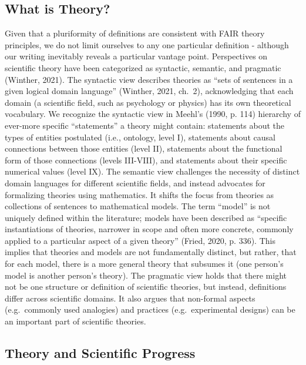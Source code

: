 \documentclass[
  man, noextraspace,floatsintext]{apa7}
\begin{document}
\subsection{What is Theory?}\label{what-is-theory}

Given that a pluriformity of definitions are consistent with FAIR theory principles,
we do not limit ourselves to any one particular definition - although our writing inevitably reveals a particular vantage point.
Perspectives on scientific theory have been categorized as syntactic, semantic, and pragmatic (Winther, 2021).
The syntactic view describes theories as ``sets of sentences in a given logical domain language'' (Winther, 2021, ch.~2),
acknowledging that each domain (a scientific field, such as psychology or physics) has its own theoretical vocabulary.
We recognize the syntactic view in Meehl's (1990, p. 114) hierarchy of ever-more specific ``statements'' a theory might contain:
statements about the types of entities postulated (i.e., ontology, level I),
statements about causal connections between those entities (level II),
statements about the functional form of those connections (levels III-VIII),
and statements about their specific numerical values (level IX).
The semantic view challenges the necessity of distinct domain languages for different scientific fields, and instead advocates for formalizing theories using mathematics.
It shifts the focus from theories as collections of sentences to mathematical models.
The term ``model'' is not uniquely defined within the literature;
models have been described as ``specific instantiations of theories, narrower in scope and often more concrete, commonly applied to a particular aspect of a given theory'' (Fried, 2020, p. 336).
This implies that theories and models are not fundamentally distinct, but rather, that for each model, there is a more general theory that subsumes it (one person's model is another person's theory).
The pragmatic view holds that there might not be one structure or definition of scientific theories, but instead, definitions differ across scientific domains.
It also argues that non-formal aspects (e.g.~commonly used analogies) and practices (e.g.~experimental designs) can be an important part of scientific theories.

\subsection{Theory and Scientific Progress}\label{theory-and-scientific-progress}
\end{document}
